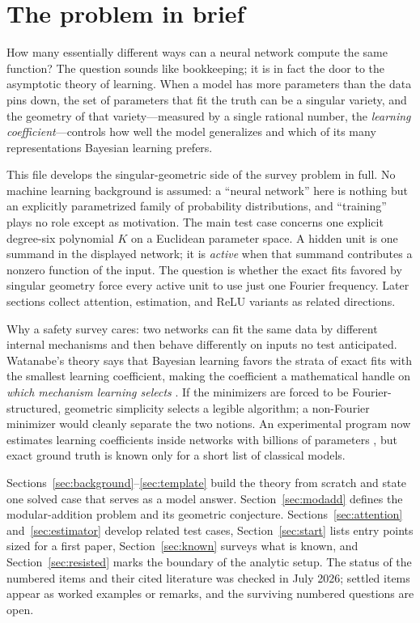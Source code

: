 \documentclass[11pt]{amsart}
\theoremstyle{plain}
\theoremstyle{definition}
\begin{document}
\setcounter{tocdepth}{1}
\tableofcontents

\section{The problem in brief}\label{sec:brief}

How many essentially different ways can a neural network compute the same function? The question sounds like bookkeeping; it is in fact the door to the asymptotic theory of learning. When a model has more parameters than the data pins down, the set of parameters that fit the truth can be a singular variety, and the geometry of that variety---measured by a single rational number, the \emph{learning coefficient}---controls how well the model generalizes and which of its many representations Bayesian learning prefers.



This file develops the singular-geometric side of the survey problem in full. No machine learning background is assumed: a ``neural network'' here is nothing but an explicitly parametrized family of probability distributions, and ``training'' plays no role except as motivation. The main test case concerns one explicit degree-six polynomial $K$ on a Euclidean parameter space. A hidden unit is one summand in the displayed network; it is \emph{active} when that summand contributes a nonzero function of the input. The question is whether the exact fits favored by singular geometry force every active unit to use just one Fourier frequency. Later sections collect attention, estimation, and ReLU variants as related directions.

Why a safety survey cares: two networks can fit the same data by different internal mechanisms and then behave differently on inputs no test anticipated. Watanabe's theory says that Bayesian learning favors the strata of exact fits with the smallest learning coefficient, making the coefficient a mathematical handle on \emph{which mechanism learning selects} \cite{lehalleur2025}. If the minimizers are forced to be Fourier-structured, geometric simplicity selects a legible algorithm; a non-Fourier minimizer would cleanly separate the two notions. An experimental program now estimates learning coefficients inside networks with billions of parameters \cite{lau2023, murfet2026}, but exact ground truth is known only for a short list of classical models.

Sections~\ref{sec:background}--\ref{sec:template} build the theory from scratch and state one solved case that serves as a model answer. Section~\ref{sec:modadd} defines the modular-addition problem and its geometric conjecture. Sections~\ref{sec:attention} and~\ref{sec:estimator} develop related test cases, Section~\ref{sec:start} lists entry points sized for a first paper, Section~\ref{sec:known} surveys what is known, and Section~\ref{sec:resisted} marks the boundary of the analytic setup. The status of the numbered items and their cited literature was checked in July 2026; settled items appear as worked examples or remarks, and the surviving numbered questions are open.
\end{document}

